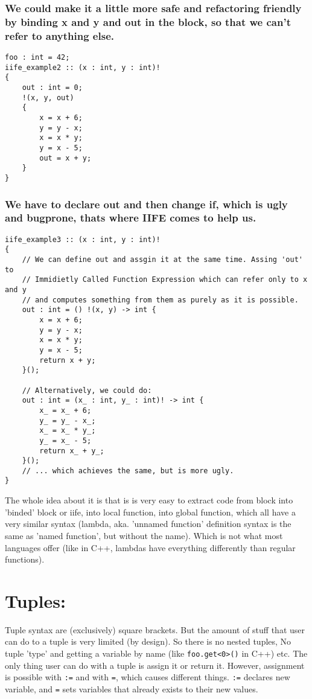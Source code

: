 \documentclass[11pt]{article}
\begin{document}
\subsubsection*{We could make it a little more safe and refactoring friendly by binding x and y and out in the block, so that we can't refer to anything else.}
\label{sec:orgcead705}
\begin{verbatim}
foo : int = 42;
iife_example2 :: (x : int, y : int)!
{
    out : int = 0;
    !(x, y, out)
    {
        x = x + 6;
        y = y - x;
        x = x * y;
        y = x - 5;
        out = x + y;
    }
}
\end{verbatim}

\subsubsection*{We have to declare out and then change if, which is ugly and bugprone, thats where IIFE comes to help us.}
\label{sec:orge34d758}
\begin{verbatim}
iife_example3 :: (x : int, y : int)!
{
    // We can define out and assgin it at the same time. Assing 'out' to
    // Immidietly Called Function Expression which can refer only to x and y
    // and computes something from them as purely as it is possible.
    out : int = () !(x, y) -> int {
        x = x + 6;
        y = y - x;
        x = x * y;
        y = x - 5;
        return x + y;
    }();

    // Alternatively, we could do:
    out : int = (x_ : int, y_ : int)! -> int {
        x_ = x_ + 6;
        y_ = y_ - x_;
        x_ = x_ * y_;
        y_ = x_ - 5;
        return x_ + y_;
    }();
    // ... which achieves the same, but is more ugly.
}
\end{verbatim}

The whole idea about it is that is is very easy to extract code from block
into 'binded' block or iife, into local function, into global function,
which all have a very similar syntax (lambda, aka. 'unnamed function'
definition syntax is the same as 'named function', but without the
name). Which is not what most languages offer (like in C++, lambdas have
everything differently than regular functions).

\section*{Tuples:}
\label{sec:orgd57ab0e}

Tuple syntax are (exclusively) square brackets. But the amount of stuff that
user can do to a tuple is very limited (by design). So there is no nested
tuples, No tuple 'type' and getting a variable by name (like
\texttt{foo.get<0>()} in C++) etc.  The only thing user can do with a tuple is
assign it or return it. However, assignment is possible with \texttt{:=} and
with \texttt{=}, which causes different things. \texttt{:=} declares new
variable, and \texttt{=} sets variables that already exists to their new
values.
\end{document}
